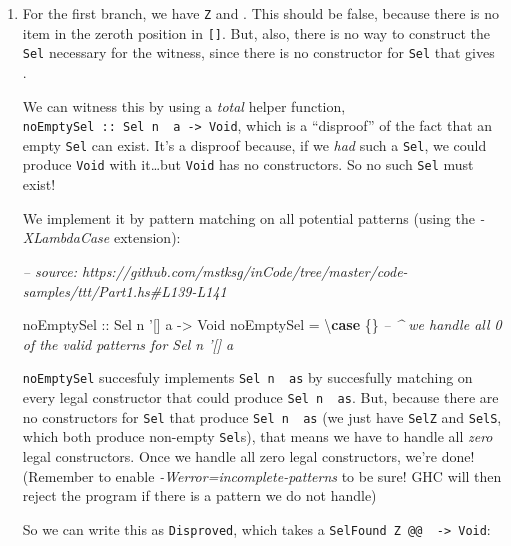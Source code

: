\documentclass[]{article}
\newenvironment{Shaded}{}{}
\newcommand{\CommentTok}[1]{\textcolor[rgb]{0.38,0.63,0.69}{\textit{#1}}}
\newcommand{\DataTypeTok}[1]{\textcolor[rgb]{0.56,0.13,0.00}{#1}}
\newcommand{\FunctionTok}[1]{\textcolor[rgb]{0.02,0.16,0.49}{#1}}
\newcommand{\KeywordTok}[1]{\textcolor[rgb]{0.00,0.44,0.13}{\textbf{#1}}}
\newcommand{\NormalTok}[1]{#1}
\newcommand{\OtherTok}[1]{\textcolor[rgb]{0.00,0.44,0.13}{#1}}
\begin{document}
\begin{enumerate}
\def\labelenumi{\arabic{enumi}.}
\item
  For the first branch, we have \texttt{\textquotesingle{}Z} and
  \texttt{\textquotesingle{}{[}{]}}. This should be false, because there is no
  item in the zeroth position in \texttt{{[}{]}}. But, also, there is no way to
  construct the \texttt{Sel} necessary for the witness, since there is no
  constructor for \texttt{Sel} that gives \texttt{\textquotesingle{}{[}{]}}.

  We can witness this by using a \emph{total} helper function,
  \texttt{noEmptySel\ ::\ Sel\ n\ \textquotesingle{}{[}{]}\ a\ -\textgreater{}\ Void},
  which is a ``disproof'' of the fact that an empty \texttt{Sel} can exist. It's
  a disproof because, if we \emph{had} such a \texttt{Sel}, we could produce
  \texttt{Void} with it\ldots{}but \texttt{Void} has no constructors. So no such
  \texttt{Sel} must exist!

  We implement it by pattern matching on all potential patterns (using the
  \emph{-XLambdaCase} extension):

\begin{Shaded}
\begin{Highlighting}[]
\CommentTok{-- source: https://github.com/mstksg/inCode/tree/master/code-samples/ttt/Part1.hs#L139-L141}

\OtherTok{noEmptySel ::} \DataTypeTok{Sel}\NormalTok{ n '[] a }\OtherTok{->} \DataTypeTok{Void}
\NormalTok{noEmptySel }\FunctionTok{=}\NormalTok{ \textbackslash{}}\KeywordTok{case}\NormalTok{ \{\}}
            \CommentTok{-- ^ we handle all 0 of the valid patterns for Sel n '[] a}
\end{Highlighting}
\end{Shaded}

  \texttt{noEmptySel} succesfuly implements
  \texttt{Sel\ n\ \textquotesingle{}{[}{]}\ as} by succesfully matching on every
  legal constructor that could produce
  \texttt{Sel\ n\ \textquotesingle{}{[}{]}\ as}. But, because there are no
  constructors for \texttt{Sel} that produce
  \texttt{Sel\ n\ \textquotesingle{}{[}{]}\ as} (we just have \texttt{SelZ} and
  \texttt{SelS}, which both produce non-empty \texttt{Sel}s), that means we have
  to handle all \emph{zero} legal constructors. Once we handle all zero legal
  constructors, we're done! (Remember to enable
  \emph{-Werror=incomplete-patterns} to be sure! GHC will then reject the
  program if there is a pattern we do not handle)

  So we can write this as \texttt{Disproved}, which takes a
  \texttt{SelFound\ \textquotesingle{}Z\ @@\ \textquotesingle{}{[}{]}\ -\textgreater{}\ Void}:


\end{enumerate}
\end{document}
